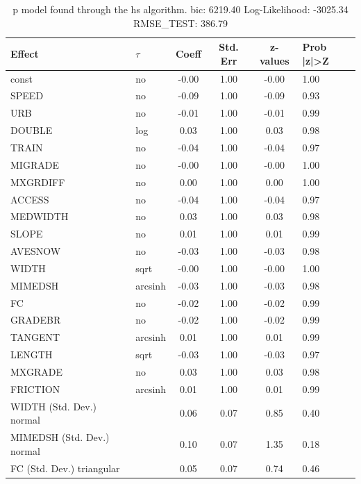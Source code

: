 \begin{table}
	\caption{p model found through the hs algorithm. bic: 6219.40 Log-Likelihood: -3025.34 RMSE_TEST: 386.79}
	\begin{center}
		\begin{tabular}{|l|l|c|c|c|l|}
			\hline
			Effect & $\tau$ & Coeff & Std. Err & z-values & Prob |z|>Z \\
			\hline
			const & no & -0.00 & 1.00 & -0.00 & 1.00 \\
			\hline
			SPEED & no & -0.09 & 1.00 & -0.09 & 0.93 \\
			\hline
			URB & no & -0.01 & 1.00 & -0.01 & 0.99 \\
			\hline
			DOUBLE & log & 0.03 & 1.00 & 0.03 & 0.98 \\
			\hline
			TRAIN & no & -0.04 & 1.00 & -0.04 & 0.97 \\
			\hline
			MIGRADE & no & -0.00 & 1.00 & -0.00 & 1.00 \\
			\hline
			MXGRDIFF & no & 0.00 & 1.00 & 0.00 & 1.00 \\
			\hline
			ACCESS & no & -0.04 & 1.00 & -0.04 & 0.97 \\
			\hline
			MEDWIDTH & no & 0.03 & 1.00 & 0.03 & 0.98 \\
			\hline
			SLOPE & no & 0.01 & 1.00 & 0.01 & 0.99 \\
			\hline
			AVESNOW & no & -0.03 & 1.00 & -0.03 & 0.98 \\
			\hline
			WIDTH & sqrt & -0.00 & 1.00 & -0.00 & 1.00 \\
			\hline
			MIMEDSH & arcsinh & -0.03 & 1.00 & -0.03 & 0.98 \\
			\hline
			FC & no & -0.02 & 1.00 & -0.02 & 0.99 \\
			\hline
			GRADEBR & no & -0.02 & 1.00 & -0.02 & 0.99 \\
			\hline
			TANGENT & arcsinh & 0.01 & 1.00 & 0.01 & 0.99 \\
			\hline
			LENGTH & sqrt & -0.03 & 1.00 & -0.03 & 0.97 \\
			\hline
			MXGRADE & no & 0.03 & 1.00 & 0.03 & 0.98 \\
			\hline
			FRICTION & arcsinh & 0.01 & 1.00 & 0.01 & 0.99 \\
			\hline
			WIDTH (Std. Dev.) normal &  & 0.06 & 0.07 & 0.85 & 0.40 \\
			\hline
			MIMEDSH (Std. Dev.) normal &  & 0.10 & 0.07 & 1.35 & 0.18 \\
			\hline
			FC (Std. Dev.) triangular &  & 0.05 & 0.07 & 0.74 & 0.46 \\

\end{tabular}
\end{center}
\end{table}
